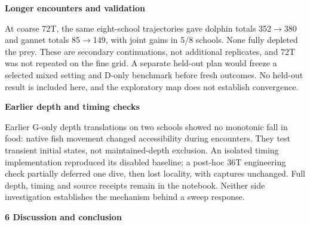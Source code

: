 \documentclass[10pt,a4paper]{article}
\begin{document}
\hfill
\begin{minipage}[t]{238.10999999999999pt}\vspace{0pt}
\textbf{Longer encounters and validation}\par At coarse 72T, the same eight-school trajectories gave dolphin totals 352\ensuremath{\rightarrow}380 and gannet totals 85\ensuremath{\rightarrow}149, with joint gains in 5/8 schools. None fully depleted the prey. These are secondary continuations, not additional replicates, and 72T was not repeated on the fine grid. A separate held-out plan would freeze a selected mixed setting and D-only benchmark before fresh outcomes. No held-out result is included here, and the exploratory map does not establish convergence.\par\smallskip
\textbf{Earlier depth and timing checks}\par Earlier G-only depth translations on two schools showed no monotonic fall in food: native fish movement changed accessibility during encounters. They test transient initial states, not maintained-depth exclusion. An isolated timing implementation reproduced its disabled baseline; a post-hoc 36T engineering check partially deferred one dive, then lost locality, with captures unchanged. Full depth, timing and source receipts remain in the notebook. Neither side investigation establishes the mechanism behind a sweep response.\par\smallskip
\end{minipage}
\clearpage
{\large\bfseries 6 Discussion and conclusion\par}\vspace{7pt}
\end{document}
